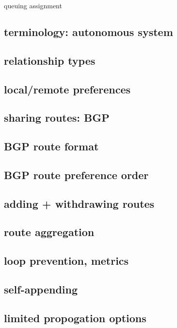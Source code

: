 \begin{frame}{queuing assignment}
\subsection{terminology: autonomous system}


\subsection{relationship types}


\subsection{local/remote preferences}


\subsection{sharing routes: BGP}


\subsection{BGP route format}


\subsection{BGP route preference order}


\subsection{adding + withdrawing routes}

\subsection{route aggregation}

\subsection{loop prevention, metrics}

\subsection{self-appending}

\subsection{limited propogation options}


\end{frame}

